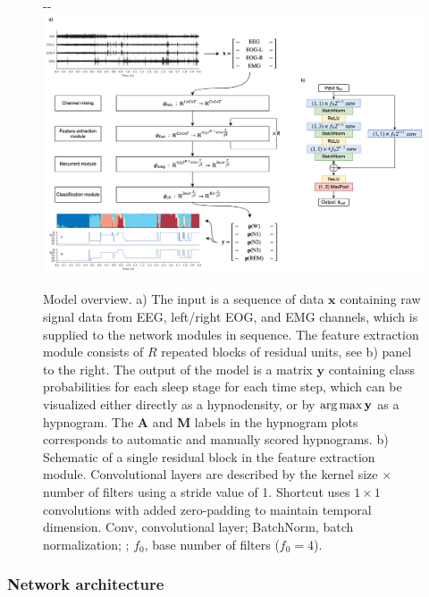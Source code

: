 \begin{figure}[tb]
\begin{adjustwidth*}{}{-\marginparwidth-\marginparsep}
    \includegraphics[width=\linewidth]{figures/paper-ii/figure_network.png}
    \caption[\acs{MASSC}v2 model overview]{Model overview. a) The input is a sequence of data \(\mathbf{x}\) containing raw signal data from \ac{EEG}, left/right \ac{EOG}, and \ac{EMG} channels, which is supplied to the network modules in sequence. The feature extraction module consists of \(R\) repeated blocks of residual units, see b) panel to the right. The output of the model is a matrix \(\mathbf{y}\) containing class probabilities for each sleep stage for each time step, which can be visualized either directly as a hypnodensity, or by \(\operatorname*{arg\,max}{\mathbf{y}}\) as a hypnogram. The \textbf{A} and \textbf{M} labels in the hypnogram plots corresponds to automatic and manually scored hypnograms. b) Schematic of a single residual block in the feature extraction module. Convolutional layers are described by the kernel size \(\times\) number of filters using a stride value of 1. Shortcut uses \(1\times1\) convolutions with added zero-padding to maintain temporal dimension. Conv, convolutional layer; BatchNorm, batch normalization; ; \(f_0\), base number of filters (\(f_0=4\)).}
    \label{fig:sleep-stages:paper-ii:figure-01}
\end{adjustwidth*}
\end{figure}

\subsubsection{Network architecture}

